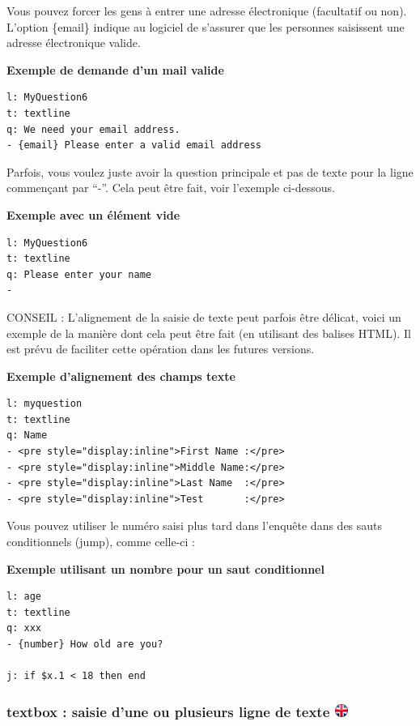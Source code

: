 \documentclass[
]{book}
\begin{document}
Vous pouvez forcer les gens à entrer une adresse électronique
(facultatif ou non). L'option \{email\} indique au logiciel de s'assurer
que les personnes saisissent une adresse électronique valide.

\textbf{Exemple de demande d'un mail valide}

\begin{verbatim}
l: MyQuestion6
t: textline
q: We need your email address.
- {email} Please enter a valid email address
\end{verbatim}

Parfois, vous voulez juste avoir la question principale et pas de texte
pour la ligne commençant par ``-''. Cela peut être fait, voir l'exemple
ci-dessous.

\textbf{Exemple avec un élément vide}

\begin{verbatim}
l: MyQuestion6
t: textline
q: Please enter your name
-
\end{verbatim}

CONSEIL : L'alignement de la saisie de texte peut parfois être délicat,
voici un exemple de la manière dont cela peut être fait (en utilisant
des balises HTML). Il est prévu de faciliter cette opération dans les
futures versions.

\textbf{Exemple d'alignement des champs texte}

\begin{verbatim}
l: myquestion
t: textline
q: Name
- <pre style="display:inline">First Name :</pre>
- <pre style="display:inline">Middle Name:</pre>
- <pre style="display:inline">Last Name  :</pre>
- <pre style="display:inline">Test       :</pre>
\end{verbatim}

Vous pouvez utiliser le numéro saisi plus tard dans l'enquête dans des
sauts conditionnels (jump), comme celle-ci :

\textbf{Exemple utilisant un nombre pour un saut conditionnel}

\begin{verbatim}
l: age
t: textline
q: xxx
- {number} How old are you?

j: if $x.1 < 18 then end
\end{verbatim}

\hypertarget{textbox-saisie-dune-ou-plusieurs-ligne-de-texte-ukflag}{%
\subsubsection[textbox : saisie d'une ou plusieurs ligne de texte
]{\texorpdfstring{textbox : saisie d'une ou plusieurs ligne de texte
\href{https://www.psytoolkit.org/doc3.2.0/online-survey-syntax.html\#textbox}{\protect\includegraphics{img/ukflag.png}}}{textbox : saisie d'une ou plusieurs ligne de texte ukflag}}\label{textbox-saisie-dune-ou-plusieurs-ligne-de-texte-ukflag}}
\end{document}
